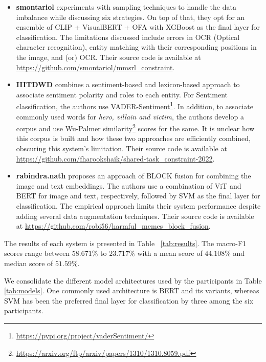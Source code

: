 \documentclass[11pt]{article}
\begin{document}
\begin{itemize}
    \item \textbf{smontariol} experiments with sampling techniques to handle the data imbalance while discussing six strategies. On top of that, they opt for an ensemble of CLIP \citep{radford_learning_2021} + VisualBERT + OFA \citep{cai_once-for-all_2020} with XGBoost as the final layer for classification. The limitations discussed include errors in OCR (Optical character recognition), entity matching with their corresponding positions in the image, and (or) OCR. Their source code is available at \url{https://github.com/smontariol/mmsrl_constraint}.
    \item \textbf{IIITDWD} combines a sentiment-based and lexicon-based approach to associate sentiment polarity and roles to each entity. For Sentiment classification, the authors use VADER-Sentiment\footnote{\url{https://pypi.org/project/vaderSentiment/}}. In addition, to associate commonly used words for \emph{hero, villain and victim}, the authors develop a corpus and use Wu-Palmer similarity\footnote{\url{https://arxiv.org/ftp/arxiv/papers/1310/1310.8059.pdf}} scores for the same. It is unclear how this corpus is built and how these two approaches are efficiently combined, obscuring this system's limitation. Their source code is available at  \url{https://github.com/fharookshaik/shared-task_constraint-2022}.
    \item \textbf{rabindra.nath} proposes an approach of BLOCK fusion \citep{ben-younes_block_2019} for combining the image and text embeddings. The authors use a combination of ViT \citep{bobicev-sokolova-2017-inter} and BERT \citep{devlin_bert_2019} for image and text, respectively, followed by SVM as the final layer for classification. The empirical approach limits their system performance despite adding several data augmentation techniques. Their source code is available at \url{https://github.com/robi56/harmful_memes_block_fusion}.
\end{itemize}

The results of each system is presented in Table ~\ref{tab:results}. The macro-F1 scores range between $58.671\%$ to $23.717\%$ with a mean score of $44.108\%$ and median score of $51.59\%$.\par
We consolidate the different model architectures used by the participants in Table \ref{tab:models}. One commonly used architecture is BERT and its variants, whereas SVM has been the preferred final layer for classification by three among the six participants. 
\end{document}
